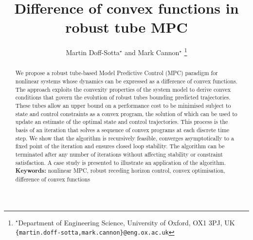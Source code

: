 \documentclass[a4paper, 10 pt, conference]{IEEEconf}
\title{\LARGE \bf
Difference of convex functions in robust tube MPC}
\author{Martin Doff-Sotta$^\star$
and
Mark Cannon$^\star$
\thanks{$^{\star}$Department of Engineering Science, University of Oxford, OX1 3PJ, UK
{\tt\small \{martin.doff-sotta,mark.cannon\}@eng.ox.ac.uk}}%
}%
\begin{document}
\maketitle
\pagestyle{plain}

\begin{abstract}
We propose a  robust tube-based Model Predictive Control (MPC) paradigm for nonlinear systems whose dynamics can be expressed as a difference of convex functions. 
%
The approach exploits the convexity properties of the system model to derive convex conditions that govern the evolution of robust tubes bounding predicted trajectories. 
%
These tubes allow an upper bound on a performance cost to be minimised subject to state and control constraints as a convex program, the solution of which can be used to update an estimate of the optimal state and control trajectories. 
%
This process is the basis of an iteration that solves a sequence of convex programs at each discrete time step. 
%
We show that the algorithm is recursively feasible, converges asymptotically to a fixed point of the iteration and ensures closed loop stability.
%
The algorithm can be terminated after any number of iterations without affecting stability or constraint satisfaction.
%
A case study is presented to illustrate an application of the algorithm. 
%
%
\\
\noindent\textbf{Keywords:}
nonlinear MPC, robust receding horizon control, convex optimisation, difference of convex functions
\end{abstract}
\end{document}
